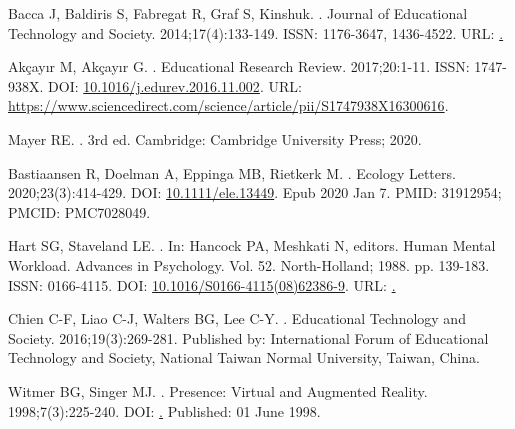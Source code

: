 \documentclass[10pt,letterpaper]{article}
\begin{document}
\begin{thebibliography}{10}
Bacca J, Baldiris S, Fabregat R, Graf S, Kinshuk.
.
\newblock Journal of Educational Technology and Society. 2014;17(4):133-149.
\newblock ISSN: 1176-3647, 1436-4522.
\newblock URL: \href{http://www.jstor.org/stable/jeductechsoci.17.4.133}.

Akçayır M, Akçayır G.
.
\newblock Educational Research Review. 2017;20:1-11.
\newblock ISSN: 1747-938X.
\newblock DOI: \href{https://doi.org/10.1016/j.edurev.2016.11.002}{10.1016/j.edurev.2016.11.002}.
\newblock URL: \href{https://www.sciencedirect.com/science/article/pii/S1747938X16300616}{https://www.sciencedirect.com/science/article/pii/S1747938X16300616}.

Mayer RE.
. 3rd ed.
\newblock Cambridge: Cambridge University Press; 2020.

Bastiaansen R, Doelman A, Eppinga MB, Rietkerk M.
.
\newblock Ecology Letters. 2020;23(3):414-429.
\newblock DOI: \href{https://doi.org/10.1111/ele.13449}{10.1111/ele.13449}.
\newblock Epub 2020 Jan 7.
\newblock PMID: 31912954; PMCID: PMC7028049.

Hart SG, Staveland LE.
.
\newblock In: Hancock PA, Meshkati N, editors. {Human Mental Workload}. Advances in Psychology. Vol. 52. North-Holland; 1988. pp. 139-183.
\newblock ISSN: 0166-4115.
\newblock DOI: \href{https://doi.org/10.1016/S0166-4115(08)62386-9}{10.1016/S0166-4115(08)62386-9}.
\newblock URL: \href{https://www.sciencedirect.com/science/article/pii/S0166411508623869}.

Chien C-F, Liao C-J, Walters BG, Lee C-Y.
.
\newblock Educational Technology and Society. 2016;19(3):269-281.
\newblock Published by: International Forum of Educational Technology and Society, National Taiwan Normal University, Taiwan, China.

Witmer BG, Singer MJ.
.
\newblock Presence: Virtual and Augmented Reality. 1998;7(3):225-240.
\newblock DOI: \href{https://doi.org/10.1162/105474698565686}.
\newblock Published: 01 June 1998.


\end{thebibliography}
\end{document}
